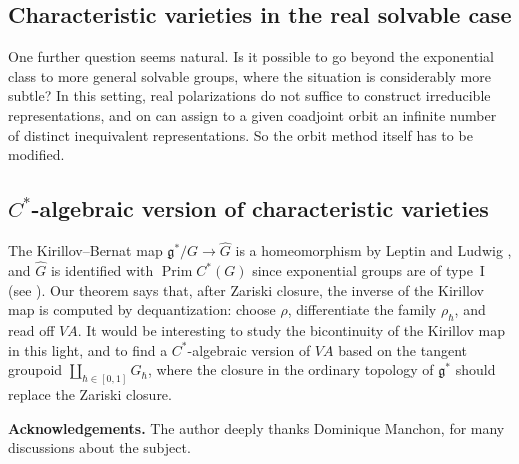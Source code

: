 \documentclass[11pt]{amsart}
\theoremstyle{plain}
\theoremstyle{definition}
\theoremstyle{remark}
\newcommand{\g}{\mathfrak g}
\newcommand{\VA}{V\!A}
\begin{document}
	
	
	
	\subsection{Characteristic varieties in the real solvable case}  One further question seems natural.  Is it possible to go beyond the exponential class to more general solvable groups, where the situation is considerably more subtle? In this setting, real polarizations do not suffice to construct irreducible representations, and on can assign to a given coadjoint orbit an infinite  number of distinct inequivalent
	representations. So the orbit method 
	itself has to be modified. 
	
	
	
	
	
	\subsection{$C^*$-algebraic version of characteristic varieties}
	
	The Kirillov--Bernat map $\g^*/G\to\widehat G$ is a homeomorphism by Leptin and Ludwig \cite{LL94}, and $\widehat G$ is identified with $\operatorname{Prim}C^*(G)$ since exponential groups are of type~I (see \cite{BDM11}). Our theorem says that, after Zariski closure, the inverse of the Kirillov map is computed by dequantization: choose $\rho$, differentiate the family $\rho_\hbar$, and read off $\VA$. It would be interesting to study the bicontinuity of the Kirillov map in this light, and to find a $C^*$-algebraic version of $\VA$ based on the tangent groupoid $\coprod_{\hbar\in[0,1]}G_\hbar$, where the closure in the ordinary topology of $\g^*$ should replace the Zariski closure.
	
	
	
	
	
	\bigskip
	\noindent\textbf{Acknowledgements.} The author deeply thanks Dominique Manchon, for many discussions about the subject.
	
\end{document}
